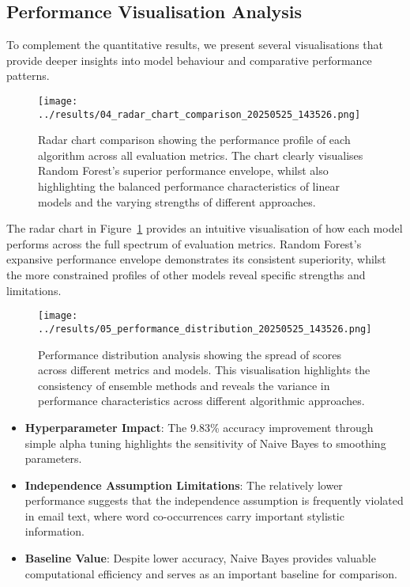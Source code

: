 \documentclass[11pt,a4paper]{article}
\begin{document}
\subsection{Performance Visualisation Analysis}

To complement the quantitative results, we present several visualisations that provide deeper insights into model behaviour and comparative performance patterns.

\begin{figure}[H]
    \centering
    \texttt{[image: ../results/04\_radar\_chart\_comparison\_20250525\_143526.png]}
    \caption{Radar chart comparison showing the performance profile of each algorithm across all evaluation metrics. The chart clearly visualises Random Forest's superior performance envelope, whilst also highlighting the balanced performance characteristics of linear models and the varying strengths of different approaches.}
    \label{fig:radar_comparison}
\end{figure}

The radar chart in Figure~\ref{fig:radar_comparison} provides an intuitive visualisation of how each model performs across the full spectrum of evaluation metrics. Random Forest's expansive performance envelope demonstrates its consistent superiority, whilst the more constrained profiles of other models reveal specific strengths and limitations.

\begin{figure}[H]
    \centering
    \texttt{[image: ../results/05\_performance\_distribution\_20250525\_143526.png]}
    \caption{Performance distribution analysis showing the spread of scores across different metrics and models. This visualisation highlights the consistency of ensemble methods and reveals the variance in performance characteristics across different algorithmic approaches.}
    \label{fig:performance_distribution}
\end{figure}

\begin{itemize}
    \item \textbf{Hyperparameter Impact}: The 9.83\% accuracy improvement through simple alpha tuning highlights the sensitivity of Naive Bayes to smoothing parameters.
    
    \item \textbf{Independence Assumption Limitations}: The relatively lower performance suggests that the independence assumption is frequently violated in email text, where word co-occurrences carry important stylistic information.
    
    \item \textbf{Baseline Value}: Despite lower accuracy, Naive Bayes provides valuable computational efficiency and serves as an important baseline for comparison.
\end{itemize}
\end{document}
